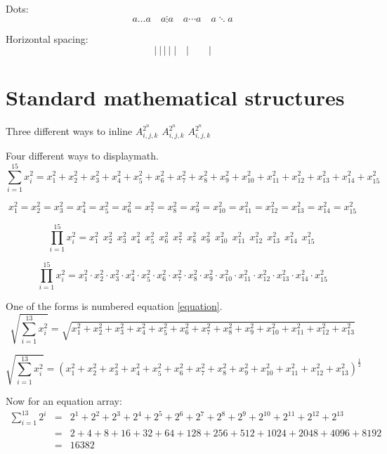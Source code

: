 Dots:
\begin{equation}
a \ldots a \quad a \vdots a \quad  a \cdots a \quad  a \ddots a
\end{equation}

Horizontal spacing:
\begin{equation}
|~|\,|\:|\;|\quad | \qquad |
\end{equation}

\section{Standard mathematical structures}

Three different ways to inline \begin{math}A_{i,j,k}^{2^n}\end{math} \(A_{i,j,k}^{2^n}\) \(A_{i,j,k}^{2^n}\)

Four different ways to displaymath.
\setcounter{equation}{99}
\begin{equation}\label{equation}
\sum_{i=1}^{15} x_i^2 = x_1^2 + x_2^2 + x_3^2 + x_4^2 + x_5^2 + x_6^2 + x_7^2 + x_8^2 + x_9^2 + x_{10}^2 + x_{11}^2 + x_{12}^2 + x_{13}^2 + x_{14}^2 + x_{15}^2 
\end{equation}

\begin{displaymath}
x_1^2 = x_2^2 = x_3^2 = x_4^2 = x_5^2 = x_6^2 = x_7^2 = x_8^2 = x_9^2 = x_{10}^2 = x_{11}^2 = x_{12}^2 = x_{13}^2 = x_{14}^2 = x_{15}^2 
\end{displaymath}

\[
\prod_{i=1}^{15} x_i^2 = x_1^2\ \ x_2^2\ \ x_3^2\ \ x_4^2\ \ x_5^2\ \ x_6^2\ \ x_7^2\ \ x_8^2\ \ x_9^2\ \ x_{10}^2\ \ x_{11}^2\ \ x_{12}^2\ \ x_{13}^2\ \ x_{14}^2\ \ x_{15}^2\ 
\]

\[
\prod_{i=1}^{15} x_i^2 = x_1^2 \cdot x_2^2 \cdot x_3^2 \cdot x_4^2 \cdot x_5^2 \cdot x_6^2 \cdot x_7^2 \cdot x_8^2 \cdot x_9^2 \cdot x_{10}^2 \cdot x_{11}^2 \cdot x_{12}^2 \cdot x_{13}^2 \cdot x_{14}^2 \cdot x_{15}^2 
\]

One of the forms is numbered equation \ref{equation}.
\[
\sqrt{\sum_{i=1}^{13} x_i^2} = \sqrt{x_1^2 + x_2^2 + x_3^2 + x_4^2 + x_5^2 + x_6^2 + x_7^2 + x_8^2 + x_9^2 + x_{10}^2+ x_{11}^2 + x_{12}^2 + x_{13}^2 }
\]

\[
\sqrt{\sum_{i=1}^{13} x_i^2} = \left(x_1^2 + x_2^2 + x_3^2 + x_4^2 + x_5^2 + x_6^2 + x_7^2 + x_8^2 + x_9^2 + x_{10}^2+ x_{11}^2 + x_{12}^2 + x_{13}^2 \right)^{\frac{1}{2}}
\]

Now for an equation array:
\begin{eqnarray}
\sum_{i=1}^{13} 2^i &=& 2^1 + 2^2 + 2^3 + 2^4 + 2^5 + 2^6 + 2^7 + 2^8 + 2^9 + 2^{10} + 2^{11} + 2^{12} + 2^{13}\nonumber\\
&=&2 + 4 + 8 + 16 + 32 + 64 + 128 + 256 + 512 + 1024 + 2048 + 4096 + 8192 \nonumber\\
&=&16382 
\end{eqnarray}

